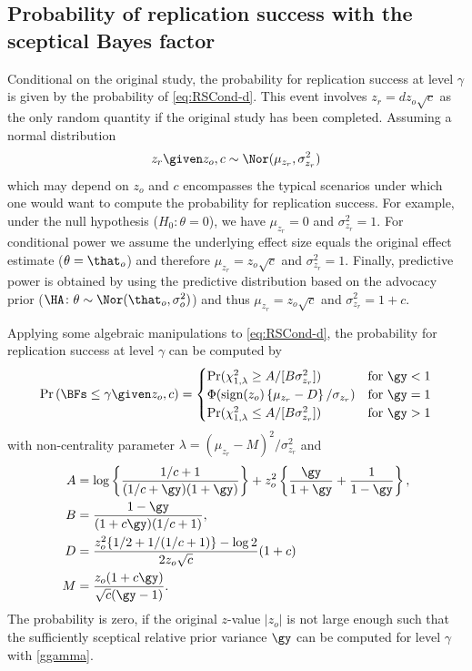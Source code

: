 \begin{subappendices}
\section{Probability of replication success with the sceptical Bayes factor}
\label{app:powerBFs}
Conditional on the original study, the probability for replication success at
level $\gamma$ is given by the probability of \eqref{eq:RSCond-d}. This event
involves $z_r = dz_o \sqrt{c}$ as the only random quantity if the original study
has been completed. Assuming a normal distribution
\begin{align*}
  z_r \given z_o, c \sim \Nor(\mu_{z_r}, \sigma^2_{z_r})
\end{align*}
which may depend on $z_o$ and $c$ encompasses the typical scenarios under which
one would want to compute the probability for replication success. For example,
under the null hypothesis ($H_{0} \colon \theta = 0$), we have $\mu_{z_r} = 0$
and $\sigma^2_{z_r} = 1$. For conditional power we assume the underlying effect
size equals the original effect estimate ($\theta = \that_o$) and therefore
$\mu_{z_r} = z_o \sqrt{c}$ and $\sigma^2_{z_r} = 1$. Finally, predictive power
is obtained by using the predictive distribution based on the advocacy prior
($\HA \colon \theta \sim \Nor(\that_o, \sigma^2_o)$) and thus
$\mu_{z_r} = z_o \sqrt{c}$ and $\sigma^2_{z_r} = 1 + c$.

Applying some algebraic manipulations to \eqref{eq:RSCond-d}, the
probability for replication success at level $\gamma$ can be computed by
\begin{align}
  \label{eq:powerBFs}
  \Pr\left(\BFs \leq \gamma \given z_o, c\right) =
  \begin{cases}
    \Pr(\chi^2_{1,\lambda} \geq  A/[B \sigma^2_{z_r}])
    & \text{for} ~ \gy < 1 \\
    \Phi(\text{sign}(z_o) \left\{\mu_{z_r} - D\right\}/\sigma_{z_r})
    & \text{for} ~ \gy = 1 \\
    \Pr(\chi^2_{1,\lambda} \leq A/[B \sigma^2_{z_r}])
    & \text{for} ~ \gy > 1
  \end{cases}
\end{align}
with non-centrality parameter $\lambda = (\mu_{z_r} - M)^2/\sigma^2_{z_r}$
and
\begin{align*}
  A &= \log \left\{ \frac{1/c + 1}{(1/c + \gy)(1 + \gy)}\right\} +
  z_o^2 \left\{\frac{\gy}{1 + \gy} + \frac{1}{1 - \gy} \right\}, \\
  B &= \frac{1 - \gy}{(1 + c\gy)(1/c + 1)}, \\
  D &= \frac{z_o^2 \{1/2 + 1/(1/c + 1)\} - \log 2}{2 z_o \sqrt{c}} (1 + c) \\
  M &= \frac{z_o(1 + c\gy)}{\sqrt{c}(\gy - 1)}.
\end{align*}
The probability is zero, if the original $z$-value $|z_o|$ is not large enough
such that the sufficiently sceptical relative prior variance $\gy$ can be
computed for level $\gamma$ with \eqref{ggamma}.


\end{subappendices}

